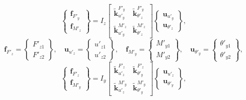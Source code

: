 \documentclass[12pt,a4paper,article]{memoir} %
\begin{document}
\begin{equation}
  \left\{ \begin{array}{c} \mathbf{f}_{F'_y} \\ \mathbf{f}_{M'_z} \end{array} \right\} = I_z \left[ \begin{array}{cc} \tilde{\mathbf{k}}_{u'_y}^{F'_y} & \tilde{\mathbf{k}}_{\theta'_z}^{F'_y} \\ \tilde{\mathbf{k}}_{u'_y}^{M'_z} & \tilde{\mathbf{k}}_{\theta'_z}^{M'_z} \end{array} \right] \left\{ \begin{array}{c} \mathbf{u}_{u'_y} \\ \mathbf{u}_{\theta'_z} \end{array} \right\},
\end{equation}
\begin{equation}
  \mathbf{f}_{F'_z} = \left\{ \begin{array}{c} F'_{z1} \\ F'_{z2} \end{array} \right\}, \quad 
  \mathbf{u}_{u'_z} = \left\{ \begin{array}{c} u'_{z1} \\ u'_{z2} \end{array} \right\}, \quad
  \mathbf{f}_{M'_y} = \left\{ \begin{array}{c} M'_{y1} \\ M'_{y2} \end{array} \right\}, \quad 
  \mathbf{u}_{\theta'_y} = \left\{ \begin{array}{c} \theta'_{y1} \\ \theta'_{y2} \end{array} \right\},
\end{equation}
\begin{equation}
  \left\{ \begin{array}{c} \mathbf{f}_{F'_z} \\ \mathbf{f}_{M'_y} \end{array} \right\} = I_y \left[ \begin{array}{cc} \tilde{\mathbf{k}}_{u'_z}^{F'_z} & \tilde{\mathbf{k}}_{\theta'_y}^{F'_z} \\ \tilde{\mathbf{k}}_{u'_z}^{M'_y} & \tilde{\mathbf{k}}_{\theta'_y}^{M'_y} \end{array} \right] \left\{ \begin{array}{c} \mathbf{u}_{u'_z} \\ \mathbf{u}_{\theta'_y} \end{array} \right\},
\end{equation}
\end{document}
